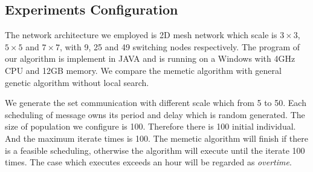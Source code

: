\documentclass[journal]{IEEEtran}
\begin{document}
\subsection{Experiments Configuration}






The network architecture we employed is 2D mesh network which scale is $3\times 3$, $5\times 5$ and $7\times 7$,
 with 9, 25 and 49 switching nodes respectively.
The program of our algorithm is implement in JAVA and is running on a Windows with 4GHz CPU and 12GB memory.
We compare the memetic algorithm with general genetic algorithm without local search. 

We generate the set communication with different scale which from 5 to 50.
Each scheduling of message owns its period and delay which is random generated.
The size of population we configure is 100.
Therefore there is 100 initial individual.
And the maximum iterate times is 100.
The memetic algorithm will finish if there is a feasible scheduling,
 otherwise the algorithm will execute until the iterate 100 times.
The case which executes exceeds an hour will be regarded as \emph{overtime}.
\end{document}
